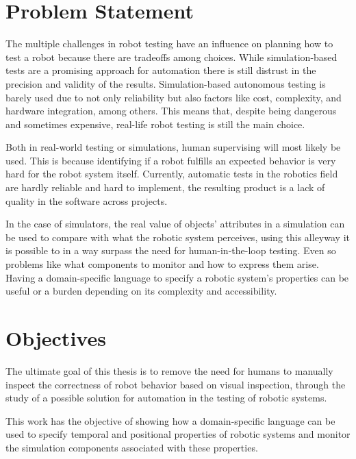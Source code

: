 \section{Problem Statement}
\label{sec:problem}

The multiple challenges in robot testing have an influence on planning how to test a robot because there are tradeoffs among choices. While simulation-based tests are a promising approach for automation there is still distrust in the precision and validity of the results. Simulation-based autonomous testing is barely used due to not only reliability but also factors like cost, complexity, and hardware integration, among others. This means that, despite being dangerous and sometimes expensive, real-life robot testing is still the main choice. 

Both in real-world testing or simulations, human supervising will most likely be used. This is because identifying if a robot fulfills an expected behavior is very hard for the robot system itself. Currently, automatic tests in the robotics field are hardly reliable and hard to implement, the resulting product is a lack of quality in the software across projects.

In the case of simulators, the real value of objects' attributes in a simulation can be used to compare with what the robotic system perceives, using this alleyway it is possible to in a way surpass the need for human-in-the-loop testing. Even so problems like what components to monitor and how to express them arise. Having a domain-specific language to specify a robotic system's properties can be useful or a burden depending on its complexity and accessibility.


\section{Objectives}
\label{sec:objectives}

The ultimate goal of this thesis is to remove the need for humans to manually inspect the correctness of robot behavior based on visual inspection, through the study of a possible solution for automation in the testing of robotic systems.

This work has the objective of showing how a domain-specific language can be used to specify temporal and positional properties of robotic systems and monitor the simulation components associated with these properties.

